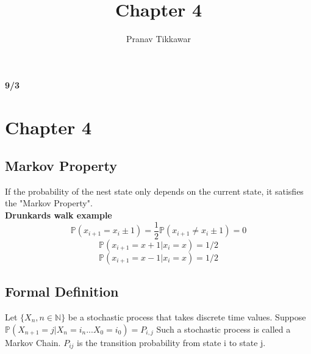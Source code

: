 \documentclass{article}
\author{Pranav Tikkawar}
\title{Chapter 4}
\begin{document}
\maketitle

\textbf{9/3}
\section*{Chapter 4}
\subsection*{Markov Property}
If the probability of the nest state only depends on the current state, it satisfies the "Markov Property".\\
\textbf{Drunkards walk example}
$$\mathds{P}(x_{i+1} = x_i \pm 1) = \frac{1}{2} \mathds{P}(x_{i+1} \neq x_i \pm 1) = 0$$
$$ \mathds{P}(x_{i+1} = x+1 | x_i = x) = 1/2$$
$$ \mathds{P}(x_{i+1} = x-1 | x_i = x) = 1/2$$
\subsection*{Formal Definition}
Let $\{X_n, n \in \mathds{N}\}$ be a stochastic process that takes discrete time values. Suppose $\mathds{P}(X_{n+1} = j | X_n = i_n ... X_0 = i_0) = P_{i,j}$ Such a stochastic process is called a Markov Chain. $P_{ij}$ is the transition probability from state i to state j.
\end{document}
